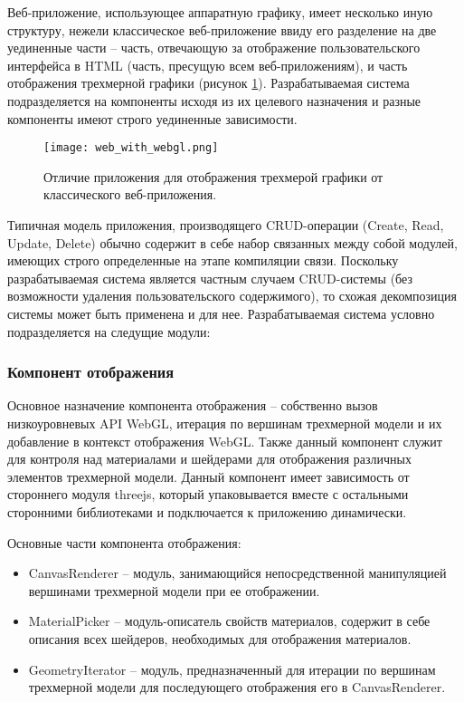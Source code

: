 Веб-приложение, использующее аппаратную графику, имеет несколько иную структуру, нежели классическое веб-приложение ввиду его разделение на две уединенные части -- часть,
отвечающую за отображение пользовательского интерфейса в HTML (часть, пресущую всем веб-приложениям), и часть отображения трехмерной графики (рисунок \ref{figure:theory:webgl_app}).
Разрабатываемая система подразделяется на компоненты исходя из их целевого назначения и разные компоненты имеют строго уединенные зависимости.

\begin{figure}[ht]
\centering
  \texttt{[image: web\_with\_webgl.png]}
  \caption{Отличие приложения для отображения трехмерой графики от классического веб-приложения.}
  \label{figure:theory:webgl_app}
\end{figure}

Типичная модель приложения, производящего CRUD-операции (Create, Read, Update, Delete) обычно содержит в себе набор связанных между собой модулей,
имеющих строго определенные на этапе компиляции связи. Поскольку разрабатываемая система является частным случаем CRUD-системы (без возможности удаления
пользовательского содержимого), то схожая декомпозиция системы может быть применена и для нее. Разрабатываемая система условно подразделяется на следущие модули:

\subsubsection{Компонент отображения}
\label{sub:theory:components:rendering}

Основное назначение компонента отображения -- собственно вызов низкоуровневых API WebGL, итерация по вершинам трехмерной модели и их добавление в контекст
отображения WebGL. Также данный компонент служит для контроля над материалами и шейдерами для отображения различных элементов трехмерной модели.
Данный компонент имеет зависимость от стороннего модуля threejs, который упаковывается вместе с остальными сторонними библиотеками и подключается к
приложению динамически.

Основные части компонента отображения:

\begin{itemize}
\item CanvasRenderer -- модуль, занимающийся непосредственной манипуляцией вершинами трехмерной модели при ее отображении.
\item MaterialPicker -- модуль-описатель свойств материалов, содержит в себе описания всех шейдеров, необходимых для отображения материалов.
\item GeometryIterator -- модуль, предназначенный для итерации по вершинам трехмерной модели для последующего отображения его в CanvasRenderer.
\end{itemize}


